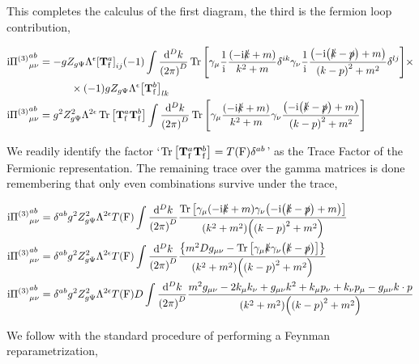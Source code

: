 This completes the calculus of the first diagram, the third is the fermion loop contribution,

\begin{align}
    \textnormal{i} {\Pi^{\qty(3)}}^{ab}_{\mu\nu}&=-gZ_{g\Psi}\Lambda^{\epsilon}\qty[\vb T^a_{\textnormal{f}}]_{ij}\qty(-1)\int\frac{\dd[D]{k}}{\qty(2\pi)^D}\Tr\qty[\gamma_\mu\frac1{\textnormal{i}}\frac{\qty(-\textnormal{i}\slashed k+m)}{k^2+m}\delta^{ik}\gamma_\nu\frac1{\textnormal{i}}\frac{\qty(-\textnormal{i}\qty(\slashed k-\slashed p)+m)}{\qty(k-p)^2+m^2}\delta^{lj}]\times\nonumber\\
    &\quad\quad\quad\times\qty(-1)gZ_{g\Psi}\Lambda^\epsilon\qty[\vb T^b_{\textnormal {f}}]_{lk}\nonumber\\
    \textnormal{i} {\Pi^{\qty(3)}}^{ab}_{\mu\nu}&=g^2Z_{g\Psi}^2\Lambda^{2\epsilon}\Tr\qty[\vb T^a_{\textnormal{f}}\vb T^b_{\textnormal{f}}]\int\frac{\dd[D]{k}}{\qty(2\pi)^D}\Tr\qty[\gamma_\mu\frac{\qty(-\textnormal{i}\slashed k+m)}{k^2+m}\gamma_\nu\frac{\qty(-\textnormal{i}\qty(\slashed k-\slashed p)+m)}{\qty(k-p)^2+m^2}]\nonumber
\end{align}

We readily identify the factor `$\Tr\qty[\vb T^a_{\textnormal{f}}\vb T^b_{\textnormal{f}}]=T\qty(\textnormal{F})\delta^{ab}$' 
as the Trace Factor of the Fermionic representation. The remaining trace over the gamma matrices is done remembering that only 
even combinations survive under the trace,

\begin{align}
    \textnormal{i} {\Pi^{\qty(3)}}^{ab}_{\mu\nu}&=\delta^{ab}g^2Z_{g\Psi}^2\Lambda^{2\epsilon}T\qty(\textnormal{F})\int\frac{\dd[D]{k}}{\qty(2\pi)^D}\frac{\Tr\qty[\gamma_\mu\qty(-\textnormal{i}\slashed k+m)\gamma_\nu\qty(-\textnormal{i}\qty(\slashed k-\slashed p)+m)]}{\qty(k^2+m^2)\qty(\qty(k-p)^2+m^2)}\nonumber\\
    \textnormal{i} {\Pi^{\qty(3)}}^{ab}_{\mu\nu}&=\delta^{ab}g^2Z_{g\Psi}^2\Lambda^{2\epsilon}T\qty(\textnormal{F})\int\frac{\dd[D]{k}}{\qty(2\pi)^D}\frac{\qty{m^2Dg_{\mu\nu}-\Tr\qty[\gamma_\mu\slashed k\gamma_\nu\qty(\slashed k-\slashed p)]}}{\qty(k^2+m^2)\qty(\qty(k-p)^2+m^2)}\nonumber\\
    \textnormal{i} {\Pi^{\qty(3)}}^{ab}_{\mu\nu}&=\delta^{ab}g^2Z_{g\Psi}^2\Lambda^{2\epsilon}T\qty(\textnormal{F})D\int\frac{\dd[D]{k}}{\qty(2\pi)^D}\frac{m^2g_{\mu\nu}-2k_{\mu}k_{\nu}+g_{\mu\nu}k^2+k_{\mu}p_\nu+k_\nu p_\mu-g_{\mu\nu}k\cdot p}{\qty(k^2+m^2)\qty(\qty(k-p)^2+m^2)}\nonumber
\end{align}

We follow with the standard procedure of performing a Feynman reparametrization,

